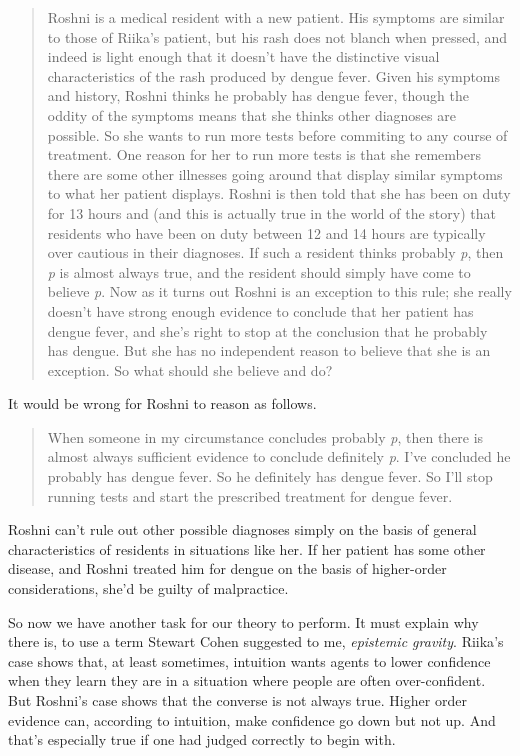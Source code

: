 \documentclass[
  10pt,
  letterpaper,
  twoside]{scrbook}
\begin{document}
\begin{quote}
{Roshni} is a medical resident with a new patient. His symptoms are
similar to those of {Riika}'s patient, but his rash does not blanch when
pressed, and indeed is light enough that it doesn't have the distinctive
visual characteristics of the rash produced by dengue fever. Given his
symptoms and history, {Roshni} thinks he probably has dengue fever,
though the oddity of the symptoms means that she thinks other diagnoses
are possible. So she wants to run more tests before commiting to any
course of treatment. One reason for her to run more tests is that she
remembers there are some other illnesses going around that display
similar symptoms to what her patient displays. {Roshni} is then told
that she has been on duty for 13 hours and (and this is actually true in
the world of the story) that residents who have been on duty between 12
and 14 hours are typically over cautious in their diagnoses. If such a
resident thinks probably \emph{p}, then \emph{p} is almost always true,
and the resident should simply have come to believe \emph{p}. Now as it
turns out {Roshni} is an exception to this rule; she really doesn't have
strong enough evidence to conclude that her patient has dengue fever,
and she's right to stop at the conclusion that he probably has dengue.
But she has no independent reason to believe that she is an exception.
So what should she believe and do?
\end{quote}

It would be wrong for {Roshni} to reason as follows.

\begin{quote}
When someone in my circumstance concludes probably \emph{p}, then there
is almost always sufficient evidence to conclude definitely \emph{p}.
I've concluded he probably has dengue fever. So he definitely has dengue
fever. So I'll stop running tests and start the prescribed treatment for
dengue fever.
\end{quote}

{Roshni} can't rule out other possible diagnoses simply on the basis of
general characteristics of residents in situations like her. If her
patient has some other disease, and {Roshni} treated him for dengue on
the basis of higher-order considerations, she'd be guilty of
malpractice.

So now we have another task for our theory to perform. It must explain
why there is, to use a term Stewart Cohen suggested to me,
\emph{epistemic gravity}. {Riika}'s case shows that, at least sometimes,
intuition wants agents to lower confidence when they learn they are in a
situation where people are often over-confident. But {Roshni}'s case
shows that the converse is not always true. Higher order evidence can,
according to intuition, make confidence go down but not up. And that's
especially true if one had judged correctly to begin with.
\end{document}

